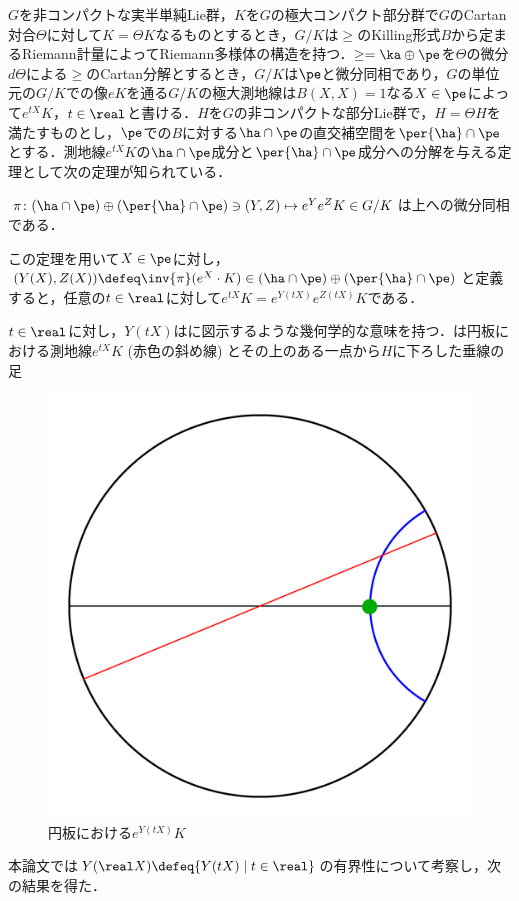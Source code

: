 $G$を非コンパクトな実半単純Lie群，$K$を$G$の極大コンパクト部分群で$G$のCartan対合$\Theta$に対して$K = \Theta K $なるものとするとき，$G/K$は$\ge$のKilling形式$B$から定まるRiemann計量によってRiemann多様体の構造を持つ．$\ge = \ka \oplus \pe $を$\Theta$の微分$d\Theta$による$\ge$のCartan分解とするとき，$G/K$は$\pe$と微分同相であり，$G$の単位元の$G/K$での像$eK$を通る$G/K$の極大測地線は$B(X, X) = 1 $なる$X\in \pe$によって$e^{tX}K $，$t\in \real$と書ける．$H$を$G$の非コンパクトな部分Lie群で，$H = \Theta H$を満たすものとし，$\pe$での$B$に対する$\ha\cap \pe$の直交補空間を$\per{\ha}\cap\pe$とする．測地線$e^{tX}K$の$\ha\cap\pe$成分と$\per{\ha}\cap\pe$成分への分解を与える定理として次の定理が知られている．

\begin{thm*}\cite[Lemma~6.1]{kob89}\label{thm:kob89-lem6.1}

  $\pi\colon  (\ha\cap\pe)\oplus (\per{\ha}\cap \pe) \ni (Y, Z)\mapsto e^{Y}e^{Z}K \in G/K $は上への微分同相である．
\end{thm*}
この定理を用いて$X\in \pe$に対し，$(Y(X), Z(X))\defeq \inv{\pi}(e^X\cdot K)\in (\ha\cap\pe)\oplus (\per{\ha}\cap \pe)$と定義すると，任意の$t\in \real$に対して$e^{tX}K = e^{Y(tX)}e^{Z(tX)}K $である．

$t\in \real$に対し，$Y(tX) $はに図示するような幾何学的な意味を持つ．は{\Poincare}円板における測地線$e^{tX}K$ (赤色の斜め線) とその上のある一点から$H$に下ろした垂線の足
\begin{figure}[H]
  \centering
  \includegraphics[scale=0.3]{../graph/y-and-z.pdf}
  \caption{{\Poincare}円板における$e^{Y(tX)}K$}
  \label{fig:y-and-z}
\end{figure}


本論文では$Y(\real X)\defeq \{Y(tX)\mid t\in \real \} $の有界性について考察し，次の結果を得た．
\begin{thm*}
  
\end{thm*}